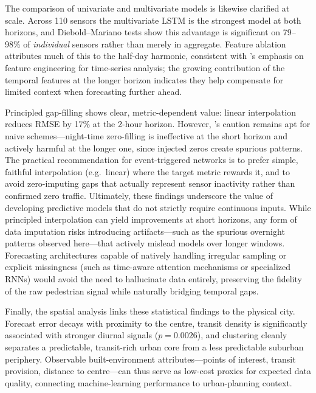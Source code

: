 \documentclass[journal,sensors,submit,pdftex,moreauthors]{Definitions/mdpi}
\begin{document}
The comparison of univariate and multivariate models is likewise clarified at scale. Across 110 sensors the multivariate LSTM is the strongest model at both horizons, and Diebold--Mariano tests show this advantage is significant on 79--98\% of \emph{individual} sensors rather than merely in aggregate. Feature ablation attributes much of this to the half-day harmonic, consistent with \cite{blazquez-garciaReviewOutlierAnomaly2021}'s emphasis on feature engineering for time-series analysis; the growing contribution of the temporal features at the longer horizon indicates they help compensate for limited context when forecasting further ahead.

Principled gap-filling shows clear, metric-dependent value: linear interpolation reduces RMSE by 17\% at the 2-hour horizon. However, \cite{cheRecurrentNeuralNetworks2018}'s caution remains apt for naive schemes---night-time zero-filling is ineffective at the short horizon and actively harmful at the longer one, since injected zeros create spurious patterns. The practical recommendation for event-triggered networks is to prefer simple, faithful interpolation (e.g.\ linear) where the target metric rewards it, and to avoid zero-imputing gaps that actually represent sensor inactivity rather than confirmed zero traffic. Ultimately, these findings underscore the value of developing predictive models that do not strictly require continuous inputs. While principled interpolation can yield improvements at short horizons, any form of data imputation risks introducing artifacts---such as the spurious overnight patterns observed here---that actively mislead models over longer windows. Forecasting architectures capable of natively handling irregular sampling or explicit missingness (such as time-aware attention mechanisms or specialized RNNs) would avoid the need to hallucinate data entirely, preserving the fidelity of the raw pedestrian signal while naturally bridging temporal gaps.

Finally, the spatial analysis links these statistical findings to the physical city. Forecast error decays with proximity to the centre, transit density is significantly associated with stronger diurnal signals ($p = 0.0026$), and clustering cleanly separates a predictable, transit-rich urban core from a less predictable suburban periphery. Observable built-environment attributes---points of interest, transit provision, distance to centre---can thus serve as low-cost proxies for expected data quality, connecting machine-learning performance to urban-planning context.
\end{document}
